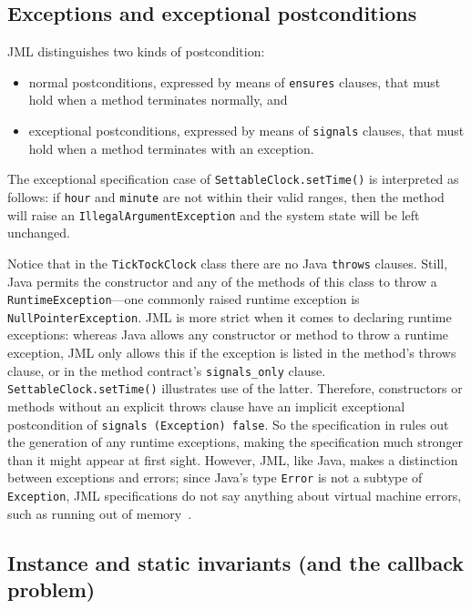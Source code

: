 \documentclass{llncs}
\begin{document}
\subsection{Exceptions and exceptional postconditions}
\label{Sec:Exceptions}

JML distinguishes two kinds of postcondition:
\begin{itemize}
  \item normal postconditions, expressed
    by means of \texttt{ensures} clauses, that must hold when a method
    terminates normally, and
    \item exceptional postconditions, expressed by means of \texttt{signals}
      clauses, that must hold when a method terminates with an exception.
\end{itemize}
%
The exceptional specification case of \texttt{SettableClock.setTime()} is
interpreted as follows: if \texttt{hour} and \texttt{minute} are not within
their valid ranges, then the method will raise an \texttt{IllegalArgumentException} 
and the system state will be left unchanged.

Notice that in the \texttt{TickTockClock} class
there are no Java \texttt{throws} clauses.
Still, Java permits the constructor and any of the methods of this class to throw a 
\texttt{Runtime\-Exception}---one commonly raised runtime exception is 
\texttt{Null\-Pointer\-Exception}.
%
JML is more strict when it comes to declaring runtime exceptions: 
whereas Java allows any constructor or method to throw a runtime exception, JML only 
allows this if the exception is listed in the method's throws clause,
or in the method contract's \texttt{signals\_only} clause.
\texttt{SettableClock.setTime()} illustrates use of the latter.
%
Therefore, constructors or methods without an explicit throws clause
have an implicit exceptional postcondition of \texttt{signals (Exception) false}.
%
So the specification in  
rules out the generation of any runtime exceptions, making the
specification much stronger than it might appear at first sight.
However, JML, like Java, makes a distinction between exceptions and errors; since
Java's type \texttt{Error} is not a subtype of \texttt{Exception},
JML specifications do not say anything about virtual machine errors,
such as running out of memory~\cite{Poetzsch-Heffter97}.

\subsection{Instance and static invariants (and the callback problem)}
\end{document}
